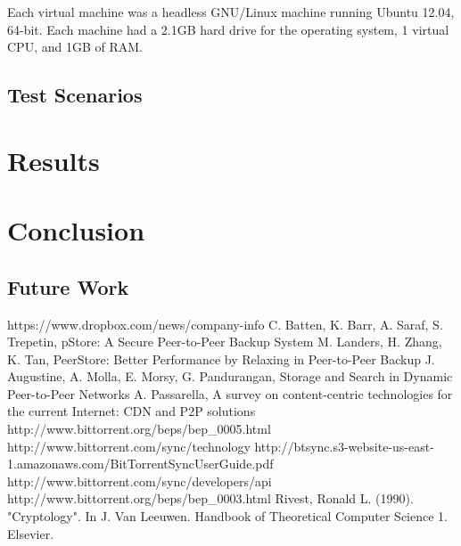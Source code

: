 \documentclass[12pt]{report}
\begin{document}
Each virtual machine was a headless GNU/Linux machine running Ubuntu 12.04, 64-bit. Each machine had a 2.1GB hard drive for the operating system, 1 virtual CPU, and 1GB of RAM.

\section{Test Scenarios} \label{sec:TestScenatios_chap:Methodology}



\chapter{Results}

\chapter{Conclusion}

\section{Future Work}



\begin{thebibliography}{11}

 https://www.dropbox.com/news/company-info
 C. Batten, K. Barr, A. Saraf, S. Trepetin, pStore: A Secure Peer-to-Peer Backup System
 M. Landers, H. Zhang, K. Tan, PeerStore: Better Performance by Relaxing in Peer-to-Peer Backup
 J. Augustine, A. Molla, E. Morsy, G. Pandurangan, Storage and Search in Dynamic Peer-to-Peer Networks
 A. Passarella, A survey on content-centric technologies for the current Internet: CDN and P2P solutions
 http://www.bittorrent.org/beps/bep\_0005.html
 http://www.bittorrent.com/sync/technology
 http://btsync.s3-website-us-east-1.amazonaws.com/BitTorrentSyncUserGuide.pdf
 http://www.bittorrent.com/sync/developers/api
 http://www.bittorrent.org/beps/bep\_0003.html
 Rivest, Ronald L. (1990). "Cryptology". In J. Van Leeuwen. Handbook of Theoretical Computer Science 1. Elsevier.

\end{thebibliography}
\end{document}
